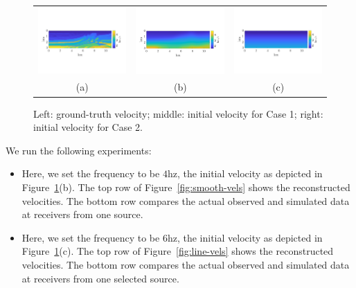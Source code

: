 \documentclass[12pt]{amsart}
\begin{document}
\begin{figure}
\centering
\begin{tabular}{ccc}
\includegraphics[width=0.33\linewidth]{Figures/marm-true.png}&
\includegraphics[width=0.33\linewidth]{Figures/smooth-init.png}&
\includegraphics[width=0.33\linewidth]{Figures/line-init.png}\\
(a)&(b)&(c)\\
\end{tabular}
\caption{Left: ground-truth velocity; middle: initial velocity for Case 1; right: initial velocity for Case 2.}
\label{fig:marm-vels}
\end{figure}

We run the following experiments:
\begin{itemize}
\item[Experiment 1] Here, we set the frequency to be $4$hz, the initial velocity as depicted in Figure~\ref{fig:marm-vels}(b). The top row of Figure~\ref{fig:smooth-vels} shows the reconstructed velocities. The bottom row compares the actual observed and simulated data at receivers from one source. 
\item[Experiment 2] Here, we set the frequency to be $6$hz, the initial velocity as depicted in Figure~\ref{fig:marm-vels}(c). The top row of Figure~\ref{fig:line-vels} shows the reconstructed velocities. The bottom row compares the actual observed and simulated data at receivers from one selected source. 
\end{itemize}
\end{document}
